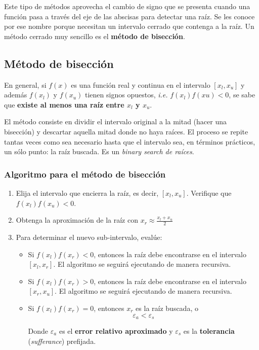 Este tipo de métodos aprovecha el cambio de signo que se presenta cuando una
función pasa a través del eje de las abscisas para detectar una raíz. Se les
conoce por ese nombre porque necesitan un intervalo cerrado que contenga a la
raíz. Un método cerrado muy sencillo es el \textbf{método de bisección}.

\subsection{Método de bisección}

En general, si $f(x)$ es una función real y continua en el intervalo $[x_l,
x_u]$ y además $f(x_l)$ y $f(x_u)$ tienen signos opuestos, \textit{i.e.}
$f(x_l) f(xu) < 0$, se sabe que \textbf{existe al menos una raíz entre $x_l$ y
$x_u$}.

El método consiste en dividir el intervalo original a la mitad (hacer una
bisección) y descartar aquella mitad donde no haya raíces. El proceso se repite
tantas veces como sea necesario hasta que el intervalo sea, en términos
prácticos, un sólo punto: la raíz buscada. Es un \textit{binary search de
raíces}.

\subsubsection{Algoritmo para el método de bisección}

\begin{enumerate}
	
	\item Elija el intervalo que encierra la raíz, es decir, $[x_l, x_u]$.
		Verifique que $f(x_l)f(x_u) < 0$.

	\item Obtenga la aproximación de la raíz con $x_r \approx \frac{x_l +
		x_u}{2}$

	\item Para determinar el nuevo sub-intervalo, evalúe:
		\begin{itemize}
			\item Si $f(x_l)f(x_r) < 0$, entonces la raíz debe
				encontrarse en el intervalo $[x_l, x_r]$. El
				algoritmo se seguirá ejecutando de manera
				recursiva.
			\item Si $f(x_l)f(x_r) > 0$, entonces la raíz debe
				encontrarse en el intervalo $[x_r, x_u]$. El
				algoritmo se seguirá ejecutando de manera
				recursiva.

			\item Si $f(x_l) f(x_r) = 0$, entonces $x_r$ es la raíz
				buscada, o
				\[
					\varepsilon_a < \varepsilon_s
				\]

				Donde $\varepsilon_a$ es el \textbf{error relativo
				aproximado} y $\varepsilon_s$ es la
				\textbf{tolerancia} (\textit{sufferance})
				prefijada.
		\end{itemize}
\end{enumerate}

